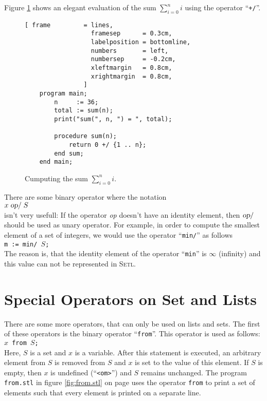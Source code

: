 Figure \ref{fig:sum-slim.stl} shows an elegant evaluation of the sum $\sum\limits_{i=0}^{n} i$
using the operator ``\texttt{+/}''.

\begin{figure}[!ht]
\centering
\begin{Verbatim}[ frame         = lines, 
                  framesep      = 0.3cm, 
                  labelposition = bottomline,
                  numbers       = left,
                  numbersep     = -0.2cm,
                  xleftmargin   = 0.8cm,
                  xrightmargin  = 0.8cm,
                ]
    program main;
        n     := 36;
        total := sum(n);
        print("sum(", n, ") = ", total);

        procedure sum(n);
            return 0 +/ {1 .. n};
        end sum;
    end main;
\end{Verbatim}
\vspace*{-0.3cm}
\caption{Cumputing the sum $\sum\limits_{i=0}^{n} i$.}
\label{fig:sum-slim.stl}
\end{figure}

There are some binary operator where the notation
\\[0.2cm]
\hspace*{1.3cm} $x \;\textsl{op}\mathtt{/}\; S$ 
\\[0.2cm]
isn't very usefull:  If the operator \textsl{op} doesn't have an identity element,
then $\textsl{op}\mathtt{/}$ should be used as unary operator.  For example, in order to
compute the smallest element of a set of integers, we would use the operator
``\texttt{min/}'' as follows \\[0.2cm]
\hspace*{1.3cm} 
\texttt{m := min/ $S$;} 
\\[0.2cm]
The reason is, that the identity element of the operator ``\texttt{min}'' is $\infty$ (infinity)
and this value can not be represented in \textsc{Setl}.


\section{Special Operators on Set and Lists}
There are some more operators, that can only be used on lists and sets.
The first of these operators is the binary  operator
``\texttt{from}''.  This operator is used as follows: 
\\[0.2cm]
\hspace*{1.3cm} \texttt{$x$ from $S$;}
\\[0.2cm]
Here,  $S$ is a set and $x$ is a variable.  After this statement is executed,
an arbitrary element from $S$ is removed from $S$ and $x$ is set to the value of this element.
If  $S$ is empty, then  $x$ is undefined (``\texttt{<om>}'') and 
$S$ remains unchanged.  The program \texttt{from.stl} in figure  \ref{fig:from.stl} 
on page \pageref{fig:from.stl} uses the operator \texttt{from} to print a set of elements
such that every element is printed on a separate line.

